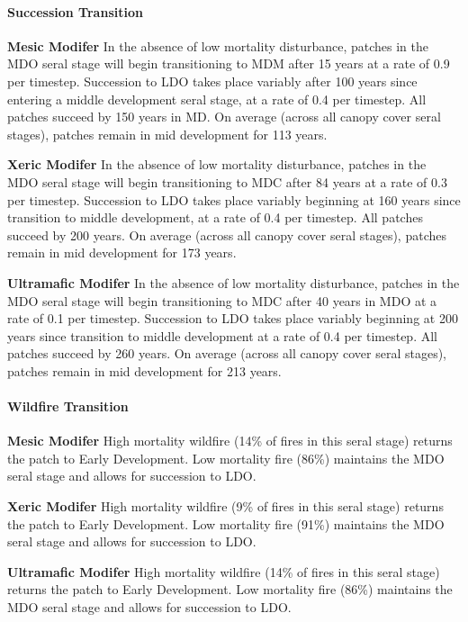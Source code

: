 \paragraph{Succession Transition}
\begin{adjustwidth}{2cm}{}
\textbf{Mesic Modifer } In the absence of low mortality disturbance, patches in the MDO seral stage will begin transitioning to MDM after 15 years at a rate of 0.9 per timestep. Succession to LDO takes place variably after 100 years since entering a middle development seral stage, at a rate of 0.4 per timestep. All patches succeed by 150 years in MD.  On average (across all canopy cover seral stages), patches remain in mid development for 113 years. 

\textbf{Xeric Modifer} In the absence of low mortality disturbance, patches in the MDO seral stage will begin transitioning to MDC after 84 years at a rate of 0.3 per timestep. Succession to LDO takes place variably beginning at 160 years since transition to middle development, at a rate of 0.4 per timestep. All patches succeed by 200 years. On average (across all canopy cover seral stages), patches remain in mid development for 173 years.

\textbf{Ultramafic Modifer} In the absence of low mortality disturbance, patches in the MDO seral stage will begin transitioning to MDC after 40 years in MDO at a rate of 0.1 per timestep. Succession to LDO takes place variably beginning at 200 years since transition to middle development at a rate of 0.4 per timestep. All patches succeed by 260 years. On average (across all canopy cover seral stages), patches remain in mid development for 213 years.

\end{adjustwidth}

\paragraph{Wildfire Transition}
\begin{adjustwidth}{2cm}{}
\textbf{Mesic Modifer } High mortality wildfire (14\% of fires in this seral stage) returns the patch to Early Development. Low mortality fire (86\%) maintains the MDO seral stage and allows for succession to LDO. 

\textbf{Xeric Modifer}  High mortality wildfire (9\% of fires in this seral stage) returns the patch to Early Development. Low mortality fire (91\%) maintains the MDO seral stage and allows for succession to LDO. 

\textbf{Ultramafic Modifer}  High mortality wildfire (14\% of fires in this seral stage) returns the patch to Early Development. Low mortality fire (86\%) maintains the MDO seral stage and allows for succession to LDO.

\end{adjustwidth}

